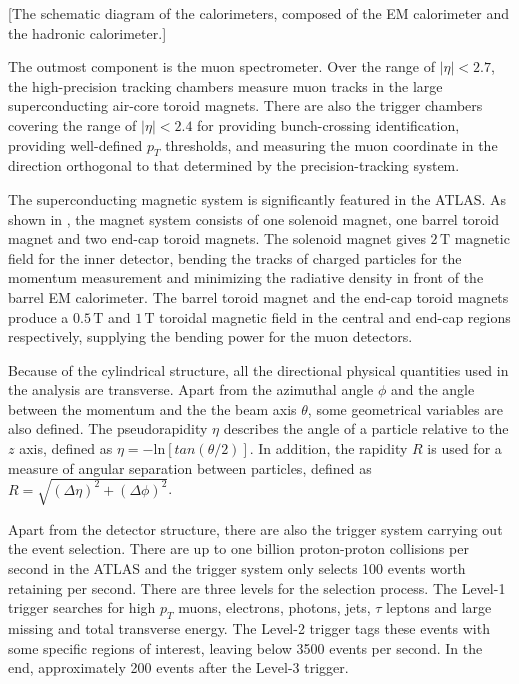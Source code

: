 \documentclass[class=NTHU_thesis, crop=false]{standalone}
\begin{document}
[The schematic diagram of the calorimeters, composed of the EM calorimeter and the hadronic calorimeter.]

The outmost component is the muon spectrometer. Over the range of $\left|\eta\right| < 2.7$, the high-precision tracking chambers measure muon tracks in the large superconducting air-core toroid magnets. There are also the trigger chambers covering the range of $\left|\eta\right| < 2.4$ for providing bunch-crossing identification, providing well-defined $p_T$ thresholds, and measuring the muon coordinate in the direction orthogonal to that determined by the precision-tracking system.

The superconducting magnetic system is significantly featured in the ATLAS. As shown in , the magnet system consists of one solenoid magnet, one barrel toroid magnet and two end-cap toroid magnets. The solenoid magnet gives $2\, \mathrm{T}$ magnetic field for the inner detector, bending the tracks of charged particles for the momentum measurement and minimizing the radiative density in front of the barrel EM calorimeter. The barrel toroid magnet and the end-cap toroid magnets produce a $0.5\, \mathrm{T}$ and $1\, \mathrm{T}$ toroidal magnetic field in the central and end-cap regions respectively, supplying the bending power for the muon detectors.

Because of the cylindrical structure, all the directional physical quantities used in the analysis are transverse. Apart from the azimuthal angle $\phi$ and the angle between the momentum and the the beam axis $\theta$, some geometrical variables are also defined. The pseudorapidity $\eta$ describes the angle of a particle relative to the $z$ axis, defined as $\eta = -\mathrm{ln}[tan(\theta/2)]$. In addition, the rapidity $R$ is used for a measure of angular separation between particles, defined as $R = \sqrt{(\Delta\eta)^2 + (\Delta\phi)^2}$.

Apart from the detector structure, there are also the trigger system carrying out the event selection. There are up to one billion proton-proton collisions per second in the ATLAS and the trigger system only selects 100 events worth retaining per second. There are three levels for the selection process. The Level-1 trigger searches for high $p_T$ muons, electrons, photons, jets, $\tau$ leptons and large missing and total transverse energy. The Level-2 trigger tags these events with some specific regions of interest, leaving below 3500 events per second. In the end, approximately 200 events after the Level-3 trigger.
\end{document}
